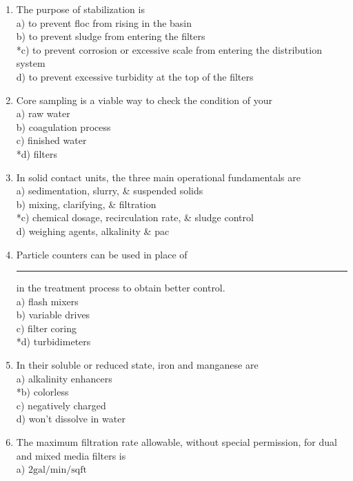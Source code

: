 \begin{enumerate}
\item The purpose of stabilization is\\
a) to prevent floc from rising in the basin\\
b) to prevent sludge from entering the filters\\
*c) to prevent corrosion or excessive scale from entering the distribution system\\
d) to prevent excessive turbidity at the top of the filters\\
\item Core sampling is a viable way to check the condition of your\\
a) raw water\\
b) coagulation process\\
c) finished water\\
*d) filters\\
\item In solid contact units, the three main operational fundamentals are\\
a) sedimentation, slurry, \& suspended solids\\
b) mixing, clarifying, \& filtration\\
*c) chemical dosage, recirculation rate, \& sludge control\\
d) weighing agents, alkalinity \& pac\\
\item Particle counters can be used in place of \rule{1.5cm}{0.5pt} in the treatment process to obtain better control.\\
a) flash mixers\\
b) variable drives\\
c) filter coring\\
*d) turbidimeters\\
\item In their soluble or reduced state, iron and manganese are\\
a) alkalinity enhancers\\
*b) colorless\\
c) negatively charged\\
d) won't dissolve in water\\
\item The maximum filtration rate allowable, without special permission, for dual and mixed media filters is\\
a) $2 \mathrm{gal} / \mathrm{min} / \mathrm{sq} \mathrm{ft}$\\

\end{enumerate}
